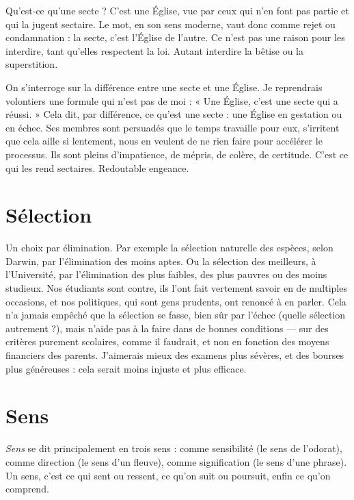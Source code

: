 Qu'est-ce qu’une secte ? C’est une Église, vue par ceux qui n’en font pas
partie et qui la jugent sectaire. Le mot, en son sens moderne, vaut donc comme
rejet ou condamnation : la secte, c’est l’Église de l’autre. Ce n’est pas une raison
pour les interdire, tant qu’elles respectent la loi. Autant interdire la bêtise ou la
superstition.

On s'interroge sur la différence entre une secte et une Église. Je reprendrais
volontiers une formule qui n’est pas de moi : « Une Église, c’est une secte qui
a réussi. » Cela dit, par différence, ce qu’est une secte : une Église en gestation
ou en échec. Ses membres sont persuadés que le temps travaille pour eux, s’irritent
que cela aille si lentement, nous en veulent de ne rien faire pour accélérer
le processus. Ils sont pleins d’impatience, de mépris, de colère, de certitude.
C’est ce qui les rend sectaires. Redoutable engeance.

\section{Sélection}
Un choix par élimination. Par exemple la sélection naturelle
des espèces, selon Darwin, par l'élimination des moins aptes.
Ou la sélection des meilleurs, à l’Université, par l'élimination des plus faibles,
des plus pauvres ou des moins studieux. Nos étudiants sont contre, ils l'ont fait
vertement savoir en de multiples occasions, et nos politiques, qui sont gens
prudents, ont renoncé à en parler. Cela n’a jamais empêché que la sélection se
fasse, bien sûr par l'échec (quelle sélection autrement ?), mais n’aide pas à la
faire dans de bonnes conditions — sur des critères purement scolaires, comme il
faudrait, et non en fonction des moyens financiers des parents. J'aimerais
mieux des examens plus sévères, et des bourses plus généreuses : cela serait
moins injuste et plus efficace.

\section{Sens}
{\it Sens} se dit principalement en trois sens : comme sensibilité (le sens de
l’odorat), comme direction (le sens d’un fleuve), comme signification
(le sens d’une phrase). Un sens, c’est ce qui sent ou ressent, ce qu’on suit ou
poursuit, enfin ce qu’on comprend.

